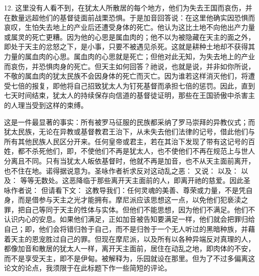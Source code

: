 12. 这里没有人看不到，在犹太人所散居的每个地方，他们为失去王国而哀伤，并在数量远超他们的基督徒面前战栗恐惧。于是加音回答说：在这里他确实因恐惧而哀叹，生怕失去地上的产业后还遭受身体的死亡。他认为这比土地不向他出产力量或属灵的死亡更糟。因为他的心思是属血肉的；他不以为被隐藏在天主的面之外，即处于天主的忿怒之下，是小事，只要不被遇见杀死。这就是耕种土地却不获得其力量的属血肉的心思。属血肉的心思就是死亡；但他对此无知，为失去地上的产业而哀伤，并恐惧肉身的死亡。但天主如何回答？祂说，也就是说，并非如你所说，不敬的属血肉的犹太民族不会因身体的死亡而灭亡。因为谁若这样消灭他们，将遭受七倍的报复，即他将自己招致犹太人为钉死基督而承担七倍的惩罚。因此，直到七天时间结束，犹太人的持续保存向信道的基督徒证明，那些在王国骄傲中杀害主的人理当受到这样的束缚。\par

 这是一件最显著的事实：所有被罗马征服的民族都采纳了罗马崇拜的异教仪式；而犹太民族，无论在异教或基督教君王治下，从未失去他们法律的记号，借此他们与所有其他民族人民区分开来。任何皇帝或君主，若在其治下发现了带有这记号的百姓，都不杀死他们，即，不使他们不再是犹太人，也不使他们不再在规范上与世人分离且不同。只有当犹太人皈依基督时，他就不再是加音，也不从天主面前离开，也不住在地。诺得据说意为。圣咏作者祈求反对这动乱之恶： 又说： 以及： 以及： 等等无数处。这恶降临于那些离开天主面前的人，即离开祂的慈爱。因此圣咏作者说： 但请看下文： 这教导我们：任何灵魂的美善、尊荣或力量，不是凭自身，而是借参与天主之光才能拥有。摩尼派应该思想这一点，以免他们犯亵渎之罪，把自己等同于天主的性体与实体。但他们不能思想，因为他们不满足。他们不认识内心的安息。如果他们满足，正如加音被告知要满足一样，他们就会把罪归给自己；即，他们会将错归咎于自己，而不是归咎于一个无人听过的黑暗种族，并藉着天主的恩宠胜过自己的罪。但现在摩尼派，以及所有以各种异端反对真理的人，都像加音和散居的犹太人一样，离开天主面前，居住在动乱之地，即肉体的不安，而不是享受天主，即不是伊甸。被解释为，乐园就设在那里。但为了不过多偏离这论文的论点，我须限于在此标题下作一些简短的评论。\par

